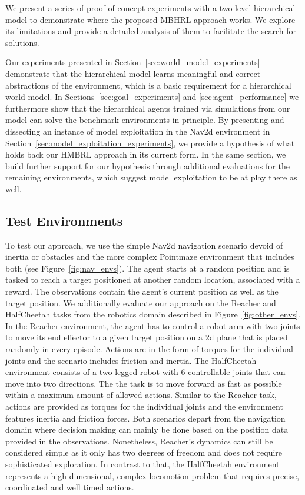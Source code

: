 \documentclass{article}
\begin{document}
We present a series of proof of concept experiments with a two level hierarchical model to demonstrate where the proposed MBHRL approach works. 
We explore its limitations and provide a detailed analysis of them to facilitate the search for solutions.

Our experiments presented in Section~\ref{sec:world_model_experiments} demonstrate that the hierarchical model learns meaningful and correct abstractions of the environment, which is a basic requirement for a hierarchical world model. In Sections~\ref{sec:goal_experiments} and \ref{sec:agent_performance} we furthermore show that the hierarchical agents trained via simulations from our model can solve the benchmark environments in principle. By presenting and dissecting an instance of model exploitation in the Nav2d environment in Section~\ref{sec:model_exploitation_experiments}, we provide a hypothesis of what holds back our HMBRL approach in its current form. In the same section, we build further support for our hypothesis through additional evaluations for the remaining environments, which suggest model exploitation to be at play there as well. 

\subsection{Test Environments}

To test our approach, we use the simple Nav2d navigation scenario devoid of inertia or obstacles and the more complex Pointmaze environment that includes both (see Figure~\ref{fig:nav_envs}). 
The agent starts at a random position and is tasked to reach a target positioned at another random location, associated with a reward. 
The observations contain the agent's current position as well as the target position. 
We additionally evaluate our approach on the Reacher and HalfCheetah tasks from the robotics domain described in Figure~\ref{fig:other_envs}. 
In the Reacher environment, the agent has to control a robot arm with two joints to move its end effector to a given target position on a 2d plane that is placed randomly in every episode.
Actions are in the form of torques for the individual joints and the scenario includes friction and inertia.
The HalfCheetah environment consists of a two-legged robot with 6 controllable joints that can move into two directions.
The the task is to move forward as fast as possible within a maximum amount of allowed actions.
Similar to the Reacher task, actions are provided as torques for the individual joints and the environment features inertia and friction forces. 
Both scenarios depart from the navigation domain where decision making can mainly be done based on the position data provided in the observations.
Nonetheless, Reacher's dynamics can still be considered simple as it only has two degrees of freedom and does not require sophisticated exploration. 
In contrast to that, the HalfCheetah environment represents a high dimensional, complex locomotion problem that requires precise, coordinated and well timed actions.
\end{document}
